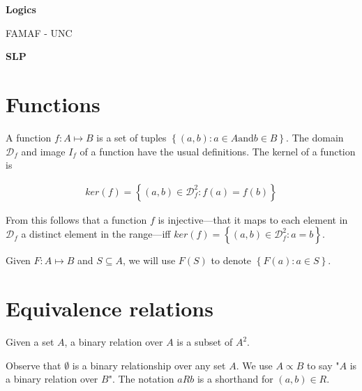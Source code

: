 \documentclass[a4paper, 12pt]{article}
\begin{document}
\begin{titlepage}
   \begin{center}
       \vspace*{1cm}

       \textbf{Logics}

       \small
       \vspace{0.5cm}
        FAMAF - UNC
            
       \vspace{1.5cm}
       \footnotesize
       \textbf{SLP}
       \normalsize

       \vfill
            
            
     
   \end{center}
\end{titlepage}


\tableofcontents
\newpage

\section{Functions}


A function $f : A \mapsto B$ is a set of tuples $\left\{ (a, b) : a \in A \text{
and} b \in B \right\} $. The domain $\mathcal{D}_f$ and image $I_f$ of a
function have the usual definitions. The kernel of a function is 

\begin{align*}
    ker(f) = \left\{ (a, b) \in \mathcal{D}_f^2 : f(a) = f(b) \right\} 
\end{align*}

From this follows that a function $f$ is injective---that it maps to each element
in $\mathcal{D}_f$ a distinct element in the range---iff $ker(f) =
\left\{ (a, b) \in \mathcal{D}_f^2 : a = b \right\} $.

Given $F : A \mapsto B$ and $S \subseteq A$, we will use $F(S)$ to denote
$\left\{ F(a) : a \in S \right\} $.


\pagebreak
\section{Equivalence relations}

\begin{definition}
    Given a set $A$, a binary relation over $A$ is a subset of $A^2$.
\end{definition}

Observe that $\emptyset$ is a binary relationship over any set $A$. We use $A
\propto B$ to say "$A$ is a binary relation over $B$". The notation $aRb$ is a
shorthand for $(a, b) \in R$.
\end{document}
